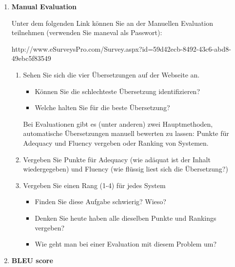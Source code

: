 \documentclass[12pt,fleqn]{article}
\begin{document}
\vspace{0.5cm} 
\begin{enumerate}

\item \textbf{Manual Evaluation} 

\vspace{0.5cm} 
Unter dem folgenden Link können Sie an der Manuellen Evaluation teilnehmen (verwenden Sie maneval als Passwort): 

http://www.eSurveysPro.com/Survey.aspx?id=59d42ecb-8492-43c6-abd8-49ebc5f83549

\vspace{0.5cm} 
\begin{enumerate} 
\item Sehen Sie sich die vier Übersetzungen auf der Webseite an.

\vspace{0.5cm} 
\begin{itemize} 
\item Können Sie die schlechteste Übersetzung identifizieren? 
\item Welche halten Sie für die beste Übersetzung?
\end{itemize} 

\vspace{0.5cm} 
Bei Evaluationen gibt es (unter anderen) zwei Hauptmethoden, automatische Übersetzungen manuell bewerten zu lassen: Punkte für Adequacy und Fluency vergeben oder Ranking von Systemen.

\vspace{0.5cm} 
\item Vergeben Sie Punkte für Adequacy (wie adäquat ist der Inhalt wiedergegeben) und Fluency (wie flüssig liest sich die Übersetzung?)

\vspace{0.5cm} 
\item Vergeben Sie einen Rang (1-4) für jedes System

\begin{itemize} 
\item Finden Sie diese Aufgabe schwierig? Wieso?
\item Denken Sie heute haben alle dieselben Punkte und Rankings vergeben? 
\item Wie geht man bei einer Evaluation mit diesem Problem um?
\end{itemize} 
\end{enumerate} 

\vspace{0.5cm} 
\item \textbf{BLEU score} 


\end{enumerate}
\end{document}
